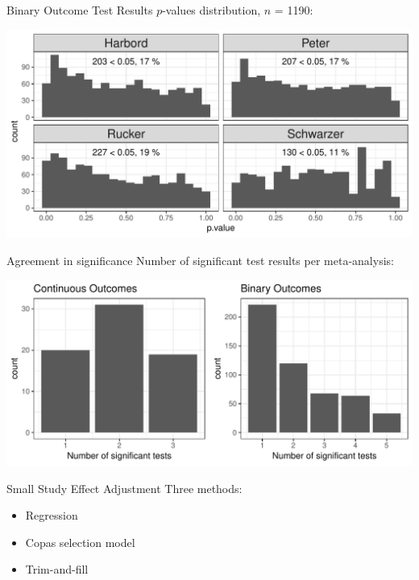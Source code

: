 \documentclass[english]{beamer}\usepackage[]{graphicx}\usepackage[]{color}
\makeatletter
\def\maxwidth{ %
  \ifdim\Gin@nat@width>\linewidth
    \linewidth
  \else
    \Gin@nat@width
  \fi
}
\newenvironment{knitrout}{}{} %
\makeatother
\begin{document}
\begin{frame}[fragile]{Binary Outcome Test Results}
$p$-values distribution, $n$ = 1190:

\vspace{-2mm}
\begin{knitrout}
\color{fgcolor}
\includegraphics[width=\maxwidth]{figure/unnamed-chunk-6-1} 

\end{knitrout}
\end{frame}

\begin{frame}[fragile]{Agreement in significance}
Number of significant test results per meta-analysis:

\vspace{-2mm}
\begin{knitrout}
\color{fgcolor}
\includegraphics[width=\maxwidth]{figure/unnamed-chunk-7-1} 

\end{knitrout}
\end{frame}

\begin{frame}{Small Study Effect Adjustment}
Three methods:
\begin{itemize}
\item Regression
\item Copas selection model
\item Trim-and-fill
\end{itemize}
\end{frame}
\end{document}
